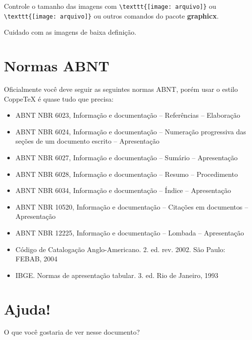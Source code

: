 \documentclass{article}
\begin{document}
Controle o tamanho das imagens com \verb!\texttt{[image: arquivo]}! ou \verb!\texttt{[image: arquivo]}! ou outros comandos do pacote \textbf{graphicx}.

Cuidado com as imagens de baixa definição.

\section{Normas ABNT}

Oficialmente você deve seguir as seguintes normas ABNT, porém usar o estilo CoppeTeX é quase tudo que precisa:
\begin{itemize}
    \item ABNT NBR 6023, Informação e documentação – Referências – Elaboração
\item ABNT NBR 6024, Informação e documentação – Numeração progressiva das seções de um documento
escrito – Apresentação
\item ABNT NBR 6027, Informação e documentação – Sumário – Apresentação
\item ABNT NBR 6028, Informação e documentação – Resumo – Procedimento
\item ABNT NBR 6034, Informação e documentação – Índice – Apresentação
\item ABNT NBR 10520, Informação e documentação – Citações em documentos – Apresentação
\item ABNT NBR 12225, Informação e documentação – Lombada – Apresentação
\item Código de Catalogação Anglo-Americano. 2. ed. rev. 2002. São Paulo: FEBAB, 2004
\item IBGE. Normas de apresentação tabular. 3. ed. Rio de Janeiro, 1993
\end{itemize}

\section{Ajuda!}

O que você gostaria de ver nesse documento? 
\end{document}
